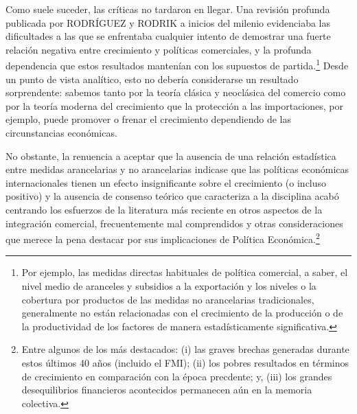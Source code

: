 \documentclass[10pt,a4paper]{article}
\begin{document}
Como suele suceder, las críticas no tardaron en llegar. Una revisión profunda publicada por RODRÍGUEZ y RODRIK a inicios del milenio evidenciaba las dificultades a las que se enfrentaba cualquier intento de demostrar una fuerte relación negativa entre crecimiento y políticas comerciales, y la profunda dependencia que estos resultados mantenían con los supuestos de partida.\footnote{%
    Por ejemplo, las medidas directas habituales de política comercial, a saber, el nivel medio de aranceles y subsidios a la exportación y los niveles o la cobertura por productos de las medidas no arancelarias tradicionales, generalmente no están relacionadas con el crecimiento de la producción o de la productividad de los factores de manera estadísticamente significativa.
} Desde un punto de vista analítico, esto no debería considerarse un resultado sorprendente: sabemos tanto por la teoría clásica y neoclásica del comercio como por la teoría moderna del crecimiento que la protección a las importaciones, por ejemplo, puede promover o frenar el crecimiento dependiendo de las circunstancias económicas. 

No obstante, la renuencia a aceptar que la ausencia de una relación estadística entre medidas arancelarias y no arancelarias indicase que las políticas económicas internacionales tienen un efecto insignificante sobre el crecimiento (o incluso positivo) y la ausencia de consenso teórico que caracteriza a la disciplina acabó centrando los esfuerzos de la literatura más reciente en otros aspectos de la integración comercial, frecuentemente mal comprendidos y otras consideraciones que merece la pena destacar por sus implicaciones de Política Económica.\footnote{%
    Entre algunos de los más destacados: (i) las graves brechas generadas durante estos últimos 40 años (incluido el FMI); (ii) los pobres resultados en términos de crecimiento en comparación con la época precdente; y, (iii) los grandes desequilibrios financieros acontecidos permanecen aún en la memoria colectiva.
}
\end{document}

